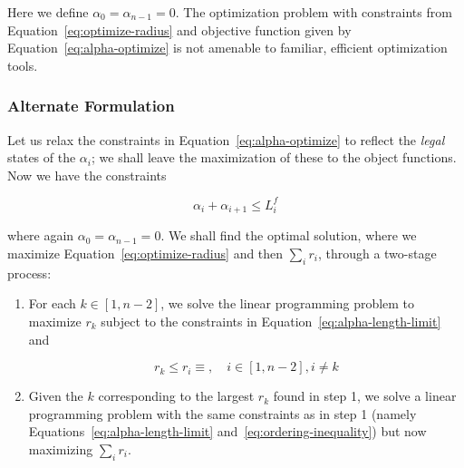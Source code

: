 \documentclass{article}
\begin{document}
Here we define $\alpha_0 = \alpha_{n-1} = 0$.  The optimization problem with constraints from Equation~\eqref{eq:optimize-radius} and objective function given by Equation~\eqref{eq:alpha-optimize} is not amenable to familiar, efficient optimization tools.

\subsubsection{Alternate Formulation}
\label{sec:alt-form}

Let us relax the constraints in Equation~\eqref{eq:alpha-optimize} to reflect the \emph{legal} states of the $\alpha_i$; we shall leave the maximization of these to the object functions.  Now we have the constraints

\begin{equation}
  \label{eq:alpha-length-limit}
  \alpha_i + \alpha_{i+1} \le L^f_i
\end{equation}

where again $\alpha_0 = \alpha_{n-1} = 0$.  We shall find the optimal solution, where we maximize Equation~\eqref{eq:optimize-radius} and then $\sum_i r_i$, through a two-stage process:

\begin{enumerate}
\item For each $k\in [1,n-2]$, we solve the linear programming problem to maximize $r_k$ subject to the constraints in Equation~\eqref{eq:alpha-length-limit} and

  \begin{equation}
    \label{eq:ordering-inequality}
    r_k \le r_i \equiv, \quad i \in [1,n-2], i \ne k
  \end{equation}

\item Given the $k$ corresponding to the largest $r_k$ found in step 1, we solve a linear programming problem with the same constraints as in step 1 (namely Equations~\eqref{eq:alpha-length-limit} and~\eqref{eq:ordering-inequality}) but now maximizing $\sum_i r_i$.
\end{enumerate}
\end{document}
